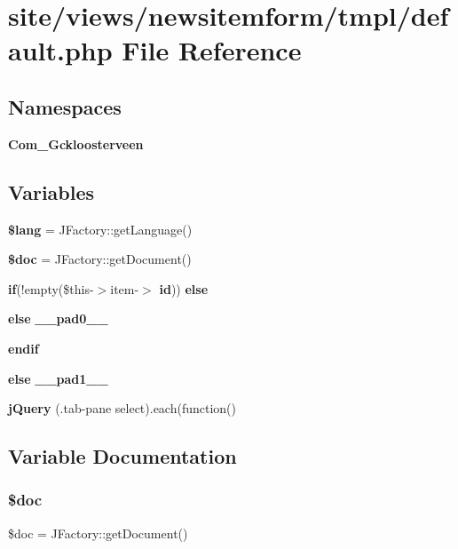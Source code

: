 \section{site/views/newsitemform/tmpl/default.php File Reference}
\label{site_2views_2newsitemform_2tmpl_2default_8php}
\subsection*{Namespaces}
\begin{DoxyCompactItemize}
\item 
 \textbf{ Com\+\_\+\+Gckloosterveen}
\end{DoxyCompactItemize}
\subsection*{Variables}
\begin{DoxyCompactItemize}
\item 
\textbf{ \$lang} = J\+Factory\+::get\+Language()
\item 
\textbf{ \$doc} = J\+Factory\+::get\+Document()
\item 
\textbf{ if}(!empty(\$this-\/$>$item-\/$>$\textbf{ id})) \textbf{ else}
\item 
\textbf{ else} \textbf{ \+\_\+\+\_\+pad0\+\_\+\+\_\+}
\item 
\textbf{ endif}
\item 
\textbf{ else} \textbf{ \+\_\+\+\_\+pad1\+\_\+\+\_\+}
\item 
\textbf{ j\+Query} (\textquotesingle{}.tab-\/pane select\textquotesingle{}).each(function()
\end{DoxyCompactItemize}


\subsection{Variable Documentation}
\mbox{\label{site_2views_2newsitemform_2tmpl_2default_8php_afc5e9ce512cd97cf2e0e25bb20dcd39b}} 
\subsubsection{\$doc}
{\footnotesize\ttfamily \$doc = J\+Factory\+::get\+Document()}

